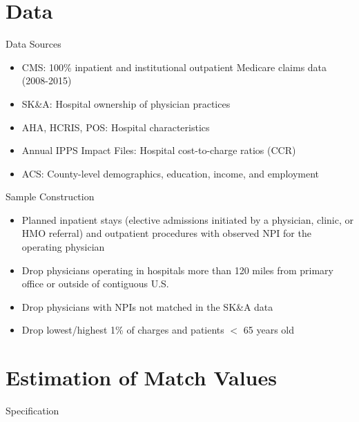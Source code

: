 \documentclass[t]{beamer}
\begin{document}
\section{Data}
\begin{frame}{Data Sources}
    \begin{itemize}
        \item CMS: 100\% inpatient and institutional outpatient Medicare claims data (2008-2015)
        \item SK\&A: Hospital ownership of physician practices
        \item AHA, HCRIS, POS: Hospital characteristics
        \item Annual IPPS Impact Files: Hospital cost-to-charge ratios (CCR)
        \item ACS: County-level demographics, education, income, and employment
    \end{itemize}
\end{frame}

\begin{frame}{Sample Construction}
    \begin{itemize}
        \item<1-> Planned inpatient stays (elective admissions initiated by a physician, clinic, or HMO referral) and outpatient procedures with observed NPI for the operating physician
        \item<2-> Drop physicians operating in hospitals more than 120 miles from primary office or outside of contiguous U.S.
        \item<3-> Drop physicians with NPIs not matched in the SK\&A data
        \item<4-> Drop lowest/highest 1\% of charges and patients $<$ 65 years old
    \end{itemize}
\end{frame}



\section{Estimation of Match Values}
\begin{frame}{Specification}
\end{frame}
\end{document}
